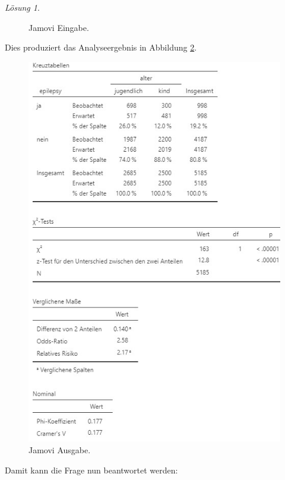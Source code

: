 \documentclass[
]{book}
\theoremstyle{definition}
\theoremstyle{definition}
\theoremstyle{definition}
\theoremstyle{definition}
\theoremstyle{remark}
\newtheorem*{solution}{Lösung}
\begin{document}
\begin{solution}
\begin{figure}
{}

\caption{Jamovi Eingabe.}\label{fig:sol-autism-epilepsy-input}
\end{figure}

Dies produziert das Analyseergebnis in Abbildung
\ref{fig:sol-autism-epilepsy-output}.

\begin{figure}

{\centering \includegraphics[width=1\linewidth]{figures/09-exr-autism-epilepsy-jmv-output} 

}

\caption{Jamovi Ausgabe.}\label{fig:sol-autism-epilepsy-output}
\end{figure}

Damit kann die Frage nun beantwortet werden:


\end{solution}
\end{document}
